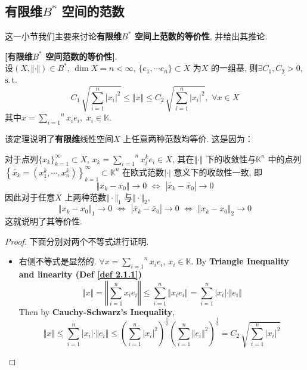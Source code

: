 \newpage

\subsection{有限维$B^*$ 空间的范数}
	这一小节我们主要来讨论\textbf{有限维$B^*$ 空间上范数的等价性}, 并给出其推论. 
	
	\vspace{2em}
	
	\begin{thm}\label{thm 2.2.2}
		\textbf{[有限维$B^*$ 空间范数的等价性]}. \\
		设$(X , \Vert \cdot \Vert) \in B^*$, $\dim X = n < \infty$, $\{ e_1 , \cdots e_n \} \subset X$ 为$X$ 的一组基, 则$\exists C_1 , C_2 > 0$, $\operatorname{s.t.}$
		\[ C_1 \, \sqrt{\sum_{i = 1}^{n} \left| x_i \right|^2} \leq \Vert x \Vert \leq C_2 \, \sqrt{\sum_{i = 1}^{n} \left| x_i \right|^2} , \,\, \forall x \in X \]
		其中$x = \overset{n}{\underset{i = 1}{\sum}} x_i e_i , \,\, x_i \in \mathbb{K}$. 
		
		\vspace{4em}
		
		\begin{rmk}
			该定理说明了\textbf{有限维}线性空间$X$ 上任意两种范数均等价. 这是因为：
			
			\vspace{1em}
			
			对于点列$\{ x_k \}_{k = 1}^{\infty} \subset X$, $x_k = \overset{n}{\underset{i = 1}{\sum}} x_{i}^k e_i \in X$, 其在$\Vert \cdot \Vert$ 下的收敛性与$\mathbb{K}^n$ 中的点列$\left\{ \widetilde{x_k} = (x_{1}^k , \cdots , x_{n}^k) \right\}_{k = 1}^{\infty} \subset \mathbb{K}^n$ 在欧式范数$| \cdot |$ 意义下的收敛性一致, 即
			\[ \Vert x_k - x_0 \Vert \to 0 \,\, \Leftrightarrow \,\, \left| \widetilde{x_k} - \widetilde{x_0} \right| \to 0 \]
			因此对于任意$X$ 上两种范数$\Vert \cdot \Vert_1$ 与$\Vert \cdot \Vert_2$, 
			\[ \Vert x_k - x_0 \Vert_1 \to 0 \,\, \Leftrightarrow \,\, \left| \widetilde{x_k} - \widetilde{x_0} \right| \to 0 \,\, \Leftrightarrow \,\, \Vert x_k - x_0 \Vert_2 \to 0 \]
			这就说明了其等价性.
		\end{rmk}
		
		\vspace{4em}
		
		\begin{proof}
			下面分别对两个不等式进行证明. 
			\begin{itemize}
				\item 右侧不等式是显然的. $\forall x = \overset{n}{\underset{i = 1}{\sum}} x_i e_i$, $x_i \in \mathbb{K}$. By \textbf{Triangle Inequality and linearity (Def \ref{def 2.1.1})}
				\[
					\Vert x \Vert 
					= \left\Vert \sum_{i = 1}^n x_i e_i \right\Vert 
					\leq \sum_{i = 1}^n \Vert x_{i} e_i \Vert 
					= \sum_{i = 1}^{n} \left| x_i \right| \cdot \Vert e_i \Vert
				\]
				Then by \textbf{Cauchy-Schwarz's Inequality}, 
				\[ \Vert x \Vert 
				\leq \sum_{i = 1}^{n} \left| x_i \right| \cdot \Vert e_i \Vert 
				\leq \left( \sum_{i = 1}^n \left| x_i \right|^2 \right)^{\tfrac{1}{2}} \left( \sum_{i = 1}^n \Vert e_i \Vert^2 \right)^{\tfrac{1}{2}} 
				= C_2 \, \sqrt{\sum_{i = 1}^{n} \left| x_i \right|^2} \]
				

\end{itemize}
\end{proof}
\end{thm}
